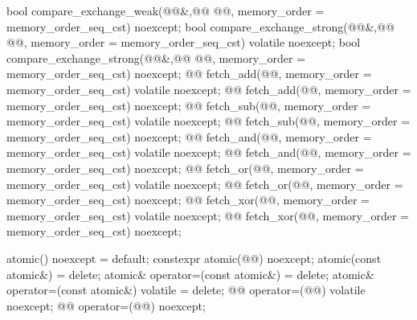 \begin{codeblock}
{    bool compare_exchange_weak(@@&,@\itcorr[-1]@ @@,
                               memory_order = memory_order_seq_cst) noexcept;
    bool compare_exchange_strong(@@&,@\itcorr[-1]@ @@,
                               memory_order = memory_order_seq_cst) volatile noexcept;
    bool compare_exchange_strong(@@&,@\itcorr[-1]@ @@,
                               memory_order = memory_order_seq_cst) noexcept;
    @@ fetch_add(@@, memory_order = memory_order_seq_cst) volatile noexcept;
    @@ fetch_add(@@, memory_order = memory_order_seq_cst) noexcept;
    @@ fetch_sub(@@, memory_order = memory_order_seq_cst) volatile noexcept;
    @@ fetch_sub(@@, memory_order = memory_order_seq_cst) noexcept;
    @@ fetch_and(@@, memory_order = memory_order_seq_cst) volatile noexcept;
    @@ fetch_and(@@, memory_order = memory_order_seq_cst) noexcept;
    @@ fetch_or(@@, memory_order = memory_order_seq_cst) volatile noexcept;
    @@ fetch_or(@@, memory_order = memory_order_seq_cst) noexcept;
    @@ fetch_xor(@@, memory_order = memory_order_seq_cst) volatile noexcept;
    @@ fetch_xor(@@, memory_order = memory_order_seq_cst) noexcept;

    atomic() noexcept = default;
    constexpr atomic(@@) noexcept;
    atomic(const atomic&) = delete;
    atomic& operator=(const atomic&) = delete;
    atomic& operator=(const atomic&) volatile = delete;
    @@ operator=(@@) volatile noexcept;
    @@ operator=(@@) noexcept;

}
\end{codeblock}
